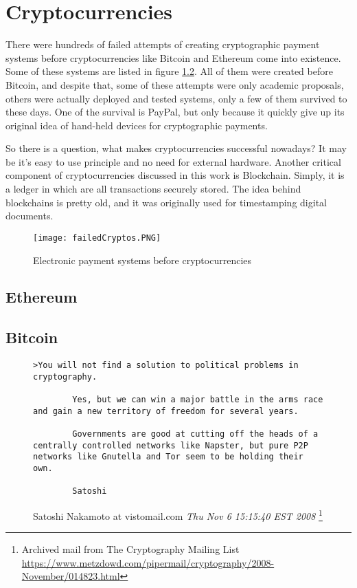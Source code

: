 \chapter{Cryptocurrencies}

There were hundreds of failed attempts of creating cryptographic payment systems before cryptocurrencies like Bitcoin and Ethereum come into existence. Some of these systems are listed in figure \ref{paymentSystems}. All of them were created before Bitcoin, and despite that, some of these attempts were only academic proposals, others were actually deployed and tested systems, only a few of them survived to these days. One of the survival is PayPal, but only because it quickly give up its original idea of hand-held devices for cryptographic payments.\cite{wayner1997digital}

So there is a question, what makes cryptocurrencies successful nowadays?  It may be it's easy to use principle and no need for external hardware. 
Another critical component of cryptocurrencies discussed in this work is Blockchain. Simply, it is a ledger in which are all transactions securely stored. The idea behind blockchains is pretty old, and it was originally used for timestamping digital documents.\cite{haber1990time} 


\begin{figure}[h]
    \centering
    \texttt{[image: failedCryptos.PNG]}
    \caption{Electronic payment systems before cryptocurrencies \cite{narayanan2016bitcoin}}
    \label{paymentSystems}
\end{figure}

\section{Ethereum}


\section{Bitcoin}
\begin{figure}[h]
    \centering
    \begin{lstlisting}[breaklines=true]
        >You will not find a solution to political problems in cryptography.

        Yes, but we can win a major battle in the arms race and gain a new territory of freedom for several years.
        
        Governments are good at cutting off the heads of a centrally controlled networks like Napster, but pure P2P networks like Gnutella and Tor seem to be holding their own.  
        
        Satoshi
    \end{lstlisting}
    \caption{
        Satoshi Nakamoto at vistomail.com 
        \textit{Thu Nov 6 15:15:40 EST 2008}
        \protect\footnote{Archived mail from The Cryptography Mailing List 
            \url{https://www.metzdowd.com/pipermail/cryptography/2008-November/014823.html}
        }
    }
    \label{paymentSystems}
\end{figure}


